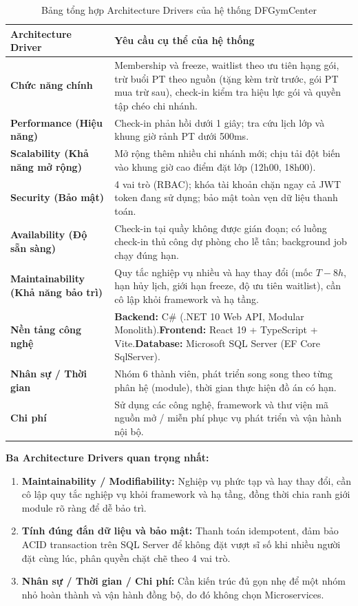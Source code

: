 \documentclass[a4paper,12pt]{article}
\begin{document}
\begin{table}[H]
\centering
\begin{tabularx}{\textwidth}{|L{4.2cm}|Y|}
\hline
\textbf{Architecture Driver} & \textbf{Yêu cầu cụ thể của hệ thống} \\ \hline
\textbf{Chức năng chính} & Membership và freeze, waitlist theo ưu tiên hạng gói, trừ buổi PT theo nguồn (tặng kèm trừ trước, gói PT mua trừ sau), check-in kiểm tra hiệu lực gói và quyền tập chéo chi nhánh. \\ \hline
\textbf{Performance (Hiệu năng)} & Check-in phản hồi dưới 1 giây; tra cứu lịch lớp và khung giờ rảnh PT dưới 500ms. \\ \hline
\textbf{Scalability (Khả năng mở rộng)} & Mở rộng thêm nhiều chi nhánh mới; chịu tải đột biến vào khung giờ cao điểm đặt lớp (12h00, 18h00). \\ \hline
\textbf{Security (Bảo mật)} & 4 vai trò (RBAC); khóa tài khoản chặn ngay cả JWT token đang sử dụng; bảo mật toàn vẹn dữ liệu thanh toán. \\ \hline
\textbf{Availability (Độ sẵn sàng)} & Check-in tại quầy không được gián đoạn; có luồng check-in thủ công dự phòng cho lễ tân; background job chạy đúng hạn. \\ \hline
\textbf{Maintainability (Khả năng bảo trì)} & Quy tắc nghiệp vụ nhiều và hay thay đổi (mốc $T-8h$, hạn hủy lịch, giới hạn freeze, độ ưu tiên waitlist), cần cô lập khỏi framework và hạ tầng. \\ \hline
\textbf{Nền tảng công nghệ} & \textbf{Backend:} C\# (.NET 10 Web API, Modular Monolith).\newline \textbf{Frontend:} React 19 + TypeScript + Vite.\newline \textbf{Database:} Microsoft SQL Server (EF Core SqlServer). \\ \hline
\textbf{Nhân sự / Thời gian} & Nhóm 6 thành viên, phát triển song song theo từng phân hệ (module), thời gian thực hiện đồ án có hạn. \\ \hline
\textbf{Chi phí} & Sử dụng các công nghệ, framework và thư viện mã nguồn mở / miễn phí phục vụ phát triển và vận hành nội bộ. \\ \hline
\end{tabularx}
\caption{Bảng tổng hợp Architecture Drivers của hệ thống DFGymCenter}
\end{table}

\textbf{Ba Architecture Drivers quan trọng nhất:}
\begin{enumerate}
    \item \textbf{Maintainability / Modifiability:} Nghiệp vụ phức tạp và hay thay đổi, cần cô lập quy tắc nghiệp vụ khỏi framework và hạ tầng, đồng thời chia ranh giới module rõ ràng để dễ bảo trì.
    \item \textbf{Tính đúng đắn dữ liệu và bảo mật:} Thanh toán idempotent, đảm bảo ACID transaction trên SQL Server để không đặt vượt sĩ số khi nhiều người đặt cùng lúc, phân quyền chặt chẽ theo 4 vai trò.
    \item \textbf{Nhân sự / Thời gian / Chi phí:} Cần kiến trúc đủ gọn nhẹ để một nhóm nhỏ hoàn thành và vận hành đồng bộ, do đó không chọn Microservices.
\end{enumerate}
\end{document}
